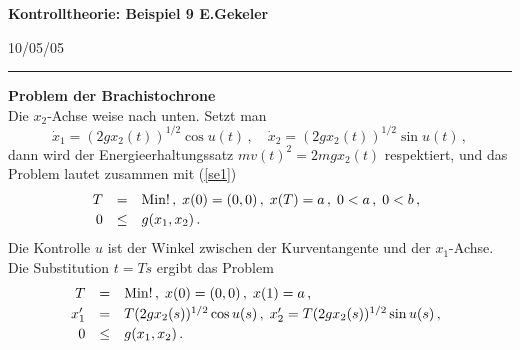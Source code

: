 \documentclass[12pt,a4paper,twoside,leqno]{article}
\newcommand{\Release}{10/05/05} %
\begin{document}
{\large\bf Kontrolltheorie: Beispiel 9 \hfill E.Gekeler}
\par
\vspace{-0.5ex}
\hfill{\footnotesize\Release\ }
\par\hrule\par\vspace{2ex}
{\bf Problem der Brachistochrone}\\
Die $x_2$-Achse weise nach unten. Setzt man
\begin{equation}\label{se1}
\dot{x}_1 = (2gx_2(t))^{1/2}\cos u(t)\,,\quad
\dot{x}_2 = (2gx_2(t))^{1/2}\sin u(t)\,,
\end{equation}
dann wird der Energieerhaltungssatz $mv(t)^2 = 2mgx_2(t)$ respektiert, und
das Problem lautet zusammen mit (\ref{se1})
\[
\ba{.}{rcl}
T &=& \Min!\,,\; x(0) = (0,0)\,,\; x(T) = a \,,\; 0 < a\,, \; 0 < b\,,\\[0.5ex]
%
0 &\leq& g(x_1,x_2)\,.
\ea{.}
\]
Die Kontrolle $u$ ist der Winkel
zwischen der Kurventangente und der $x_1$-Achse. Die Substitution $t = Ts$
ergibt das Problem
\[
\ba{.}{rcl}
T &=& \Min!\,,\; x(0) = (0,0)\,,\; x(1) = a\,,\\[0.5ex]
%
x'_1 &=& T(2gx_2(s))^{1/2}\cos u(s)\,,\;
x'_2 = T(2gx_2(s))^{1/2}\sin u(s)\,,\\[0.5ex]
0 &\leq& g(x_1,x_2)\,.
\ea{.}
\]
\end{document}
